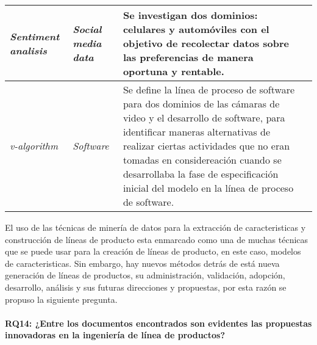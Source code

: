 \begin{longtable}{|p{3cm}|p{3cm}|p{6cm}|c|}
	\textit{Sentiment analisis}     & \textit{Social media data} &Se investigan dos dominios: celulares y automóviles con el objetivo de recolectar datos sobre las preferencias de manera oportuna y rentable.  & \cite{Tuarob2015}  \tabularnewline \hline
	\textit{v-algorithm}& \textit{Software} &Se define la línea de proceso de software para dos dominios de las cámaras de video y el desarrollo de software, para identificar maneras alternativas de realizar ciertas actividades que no eran tomadas en considereación cuando se desarrollaba la fase de especificación inicial del modelo en la línea de proceso de software.  & \cite{Simmonds2016}  \tabularnewline \hline
	
\end{longtable}

El uso de las técnicas de minería de datos para la extracción de caracteristicas y construcción de líneas de producto esta enmarcado como una de muchas técnicas que se puede usar para la creación de líneas de producto\cite{Rashid2011}, en este caso, modelos de caracteristicas\cite{Pedram2015}. Sin embargo, hay nuevos métodos detrás de está nueva generación de líneas de productos, su administración, validación, adopción, desarrollo, análisis y sus futuras direcciones y propuestas\cite{Kang2010}, por esta razón se propuso la siguiente pregunta. \\

\paragraph{RQ14: ¿Entre los documentos encontrados son evidentes las propuestas innovadoras en la ingeniería de línea de productos? }

